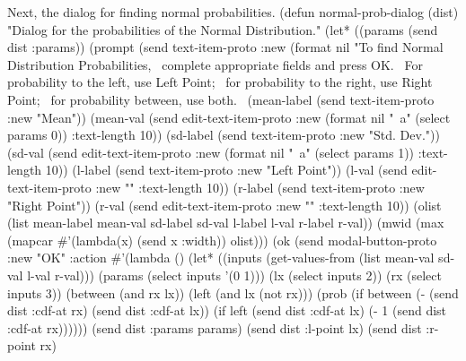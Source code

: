 Next, the dialog for finding normal probabilities. 
\nwenddocs{}\plusendmoddef
(defun normal-prob-dialog (dist)
  "Dialog for the probabilities of the Normal Distribution."
  (let* ((params (send dist :params))
         (prompt (send text-item-proto :new
                  (format nil 
                    "To find Normal Distribution Probabilities,~%
                     complete appropriate fields and press OK.~%
                     For probability to the left, use Left Point;~%
                     for probability to the right, use Right Point;~%
                     for probability between, use both.~%
         (mean-label (send text-item-proto :new "Mean"))
         (mean-val (send edit-text-item-proto :new
                         (format nil "~a" (select params 0)) :text-length 10))
         (sd-label (send text-item-proto :new "Std. Dev."))
         (sd-val (send edit-text-item-proto :new
                       (format nil "~a" (select params 1)) :text-length 10))
         (l-label (send text-item-proto :new "Left Point"))
         (l-val (send edit-text-item-proto :new "" :text-length 10))
         (r-label (send text-item-proto :new "Right Point"))
         (r-val (send edit-text-item-proto :new "" :text-length 10))
         (olist (list mean-label mean-val sd-label sd-val
                      l-label l-val r-label r-val))
         (mwid (max (mapcar #'(lambda(x) (send x :width)) olist)))
         (ok (send modal-button-proto :new "OK"
                   :action
                   #'(lambda ()
                      (let* ((inputs (get-values-from 
                                      (list mean-val sd-val l-val r-val)))
                             (params (select inputs '(0 1)))
                             (lx (select inputs 2))
                             (rx (select inputs 3))
                             (between (and rx lx))
                             (left (and lx (not rx)))
                             (prob (if between
                                      (- (send dist :cdf-at rx)
                                         (send dist :cdf-at lx))
                                     (if left
                                        (send dist :cdf-at lx)
                                       (- 1 (send dist :cdf-at rx))))))
                         (send dist :params params)
                         (send dist :l-point lx)
                         (send dist :r-point rx)
